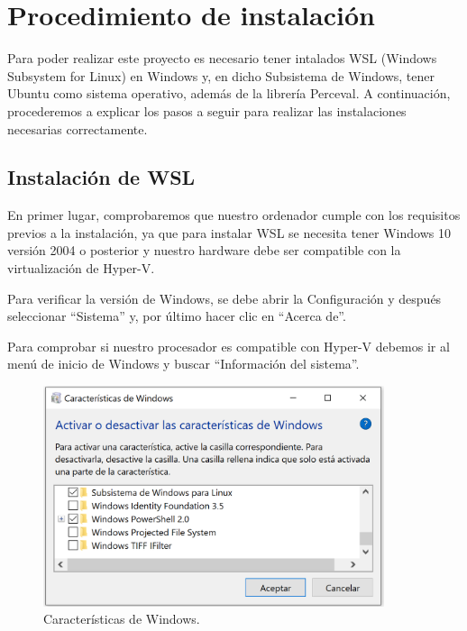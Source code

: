 \documentclass[a4paper, 12pt]{book}
\begin{document}
\section{Procedimiento de instalación} %
\label{sec:procedimiento de instalación}

Para poder realizar este proyecto es necesario tener intalados WSL (Windows Subsystem for Linux) en Windows y, en dicho Subsistema de Windows, tener Ubuntu como sistema operativo, además de la librería Perceval. 
A continuación, procederemos a explicar los pasos a seguir para realizar las instalaciones necesarias correctamente.

\subsection{Instalación de WSL} %
\label{sec:instalación de WSL}

En primer lugar, comprobaremos que nuestro ordenador cumple con los requisitos previos a la instalación, ya que para instalar WSL se necesita tener Windows 10 versión 2004 o posterior y nuestro hardware debe ser compatible con la virtualización de Hyper-V. 


Para verificar la versión de Windows, se debe abrir la Configuración y después seleccionar ``Sistema'' y, por último hacer clic en ``Acerca de''.


Para comprobar si nuestro procesador es compatible con Hyper-V debemos ir al menú de inicio de Windows y buscar ``Información del sistema''.

\begin{figure}
  \centering
  \includegraphics[width=10cm, keepaspectratio]{img/CaracteristicasWindows.PNG}
  \caption{Características de Windows.}\label{fig:CaracteristicasWindows}
\end{figure}
\end{document}
